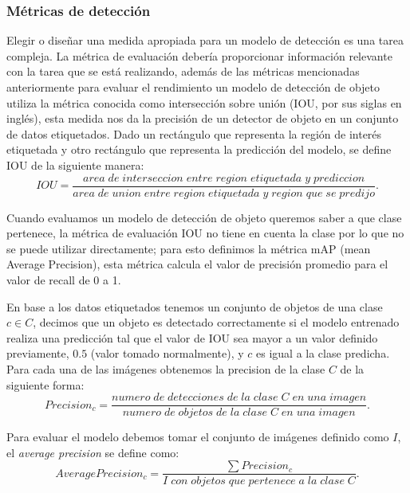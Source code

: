 \subsubsection*{Métricas de detección}\label{sub:metricas_de_deteccion}
Elegir o diseñar una medida apropiada para un modelo de detección es una tarea compleja. La métrica de evaluación debería proporcionar información relevante con la tarea que se está realizando, además de las métricas mencionadas anteriormente para evaluar el rendimiento un modelo de detección de objeto utiliza la métrica conocida como intersección sobre unión (IOU, por sus siglas en inglés), esta medida nos da la precisión de un detector de objeto en un conjunto de datos etiquetados. Dado un rectángulo que representa la región de interés etiquetada y otro rectángulo que representa la predicción del modelo, se define IOU de la siguiente manera:
\begin{equation}
IOU = \frac{area\;de\;interseccion\;entre\;region\;etiquetada\;y\;prediccion}{area\;de\;union\;entre\;region\;etiquetada\;y\;region\;que\;se\;predijo}.
\end{equation}

Cuando evaluamos un modelo de detección de objeto queremos saber a que clase pertenece, la métrica de evaluación IOU no tiene en cuenta la clase por lo que no se puede utilizar directamente; para esto definimos la métrica mAP (mean Average Precision), esta métrica calcula el valor de precisión promedio para el valor de recall de 0 a 1.

En base a los datos etiquetados tenemos un conjunto de objetos de una clase $c \in C$, decimos que un objeto es detectado correctamente si el modelo entrenado realiza una predicción tal que el valor de IOU sea mayor a un valor definido previamente, $0.5$ (valor tomado normalmente), y $c$ es igual a la clase predicha. Para cada una de las imágenes obtenemos la precision de la clase $C$ de la siguiente forma:
\begin{equation}
Precision_c = \frac{numero\;de\;detecciones\;de\;la\;clase\;C\;en\;una\;imagen}{numero\;de\;objetos\;de\;la\;clase\;C\;en\;una\;imagen}.
\end{equation}

Para evaluar el modelo debemos tomar el conjunto de imágenes definido como $I$, el \textit{average precision} se define como:
\begin{equation}
Average Precision_c = \frac{\sum Precision_c}{I\;con\;objetos\;que\;pertenece\;a\;la\;clase\;C}.
\end{equation}




